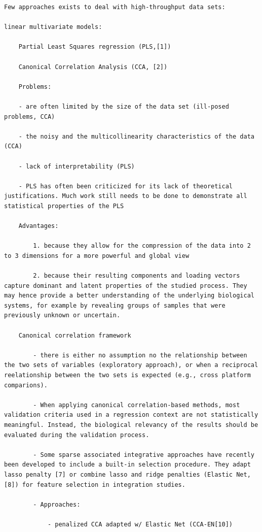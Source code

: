 \documentclass[
]{book}
\begin{document}
\begin{verbatim}
Few approaches exists to deal with high-throughput data sets:

linear multivariate models:

    Partial Least Squares regression (PLS,[1])

    Canonical Correlation Analysis (CCA, [2])

    Problems:

    - are often limited by the size of the data set (ill-posed problems, CCA)

    - the noisy and the multicollinearity characteristics of the data (CCA)

    - lack of interpretability (PLS)

    - PLS has often been criticized for its lack of theoretical justifications. Much work still needs to be done to demonstrate all statistical properties of the PLS

    Advantages:

        1. because they allow for the compression of the data into 2 to 3 dimensions for a more powerful and global view

        2. because their resulting components and loading vectors capture dominant and latent properties of the studied process. They may hence provide a better understanding of the underlying biological systems, for example by revealing groups of samples that were previously unknown or uncertain.

    Canonical correlation framework

        - there is either no assumption no the relationship between the two sets of variables (exploratory approach), or when a reciprocal reelationship between the two sets is expected (e.g., cross platform comparions).

        - When applying canonical correlation-based methods, most validation criteria used in a regression context are not statistically meaningful. Instead, the biological relevancy of the results should be evaluated during the validation process.

        - Some sparse associated integrative approaches have recently been developed to include a built-in selection procedure. They adapt lasso penalty [7] or combine lasso and ridge penalties (Elastic Net, [8]) for feature selection in integration studies.

        - Approaches:

            - penalized CCA adapted w/ Elastic Net (CCA-EN[10])


\end{verbatim}
\end{document}
